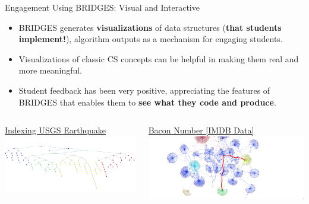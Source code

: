 \documentclass[aspectratio=169]{beamer}
\begin{document}
\begin{frame}
\end{frame}
\begin{frame}{Engagement Using BRIDGES: Visual and Interactive}
\begin{itemize}
	\item BRIDGES generates \textbf{visualizations} of data structures 
	(\textbf{that students implement!}), algorithm outputs
		as a mechanism for engaging students.
	\item Visualizations of classic CS concepts can be helpful in making
		them real and more meaningful. 
	\item Student feedback has been very positive, appreciating the features
		of BRIDGES that enables them to \textbf{see what they code and produce}.
\end{itemize}
  \begin{columns}
    \begin{column}{.47\linewidth}
      \begin{block}{\href{http://bridges-cs.herokuapp.com/assignments/137/kalpathi60}{\underline{Indexing USGS Earthquake}}}
        \includegraphics[width=\linewidth]{figs/BSTEq.png}
      \end{block}
    \end{column}
    \begin{column}{.47\linewidth}
      \begin{block}{\href{http://bridges-cs.herokuapp.com/assignments/1002/bridges_public}{\underline{Bacon Number [IMDB Data]}}}
        \includegraphics[width=\linewidth]{figs/BaconNumber.png}
      \end{block}
    \end{column}
  \end{columns}  
\end{frame}
\end{document}
